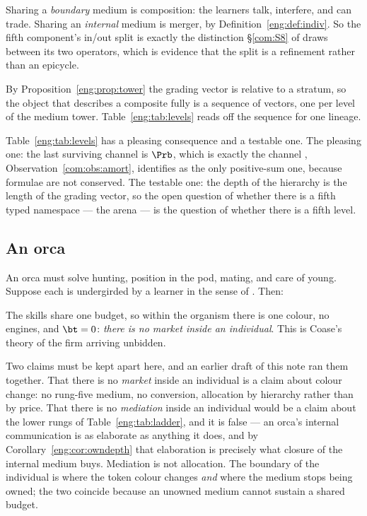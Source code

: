 \begin{corollary}\label{eng:composition-merger-two-halves}
Sharing a \emph{boundary} medium is composition: the learners talk,
interfere, and can trade. Sharing an \emph{internal} medium is merger, by
Definition~\ref{eng:def:indiv}. So the fifth component's in/out split is
exactly the distinction \S\ref{com:S8} of \chComp draws between its two
operators, which is evidence that the split is a refinement rather than an
epicycle.
\end{corollary}

\begin{corollary}\label{eng:k-sequence}
By Proposition~\ref{eng:prop:tower} the grading vector is relative to a
stratum, so the object that describes a composite fully is a sequence of
vectors, one per level of the medium tower. Table~\ref{eng:tab:levels} reads
off the sequence for one lineage.
\end{corollary}

Table~\ref{eng:tab:levels} has a pleasing consequence and a testable one. The
pleasing one: the last surviving channel is $\Prb$, which is exactly the
channel \chComp, Observation~\ref{com:obs:amort}, identifies as the only positive-sum one,
because formulae are not conserved. The testable one: the depth of the
hierarchy is the length of the grading vector, so the open question of
whether there is a fifth typed namespace --- the arena --- is the question
of whether there is a fifth level.

\subsection{An orca}\label{eng:S9.4}

An orca must solve hunting, position in the pod, mating, and care of young.
Suppose each is undergirded by a learner in the sense of \chComp.
Then:

The skills share one budget, so within the organism there is one colour, no
engines, and $\bt = 0$: \emph{there is no market inside an individual}. This
is Coase's theory of the firm \cite{coase} arriving unbidden.

Two claims must be kept apart here, and an earlier draft of this note ran
them together. That there is no \emph{market} inside an individual is a
claim about colour change: no rung-five medium, no conversion, allocation
by hierarchy rather than by price. That there is no \emph{mediation} inside
an individual would be a claim about the lower rungs of
Table~\ref{eng:tab:ladder}, and it is false --- an orca's internal
communication is as elaborate as anything it does, and by
Corollary~\ref{eng:cor:owndepth} that elaboration is precisely what closure of
the internal medium buys. Mediation is not allocation. The boundary of the
individual is where the token colour changes \emph{and} where the medium
stops being owned; the two coincide because an unowned medium cannot
sustain a shared budget.

